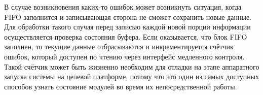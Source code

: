 В случае возникновения каких-то ошибок может возникнуть ситуация, когда FIFO заполнится и записывающая сторона не сможет сохранить новые данные. Для обработки такого случая перед записью каждой новой порции информации осуществляется проверка состояния буфера. Если оказывается, что блок FIFO заполнен, то текущие данные отбрасываются и инкрементируется счётчик ошибок, который доступен по чтению через интерфейс медленного контроля. Такой счётчик может быть жизненно необходим для отладки на этапе аппаратного запуска системы на целевой платформе, потому что это один из самых доступных способов узнать состояние модулей во время их непосредственной работы.\par
